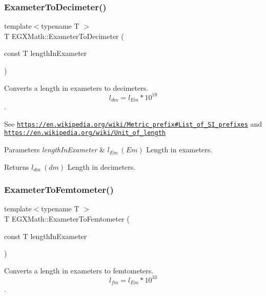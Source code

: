 \subsubsection{\texorpdfstring{Exameter\+To\+Decimeter()}{ExameterToDecimeter()}}
{\footnotesize\ttfamily template$<$typename T $>$ \\
T E\+G\+X\+Math\+::\+Exameter\+To\+Decimeter (\begin{DoxyParamCaption}\item[{const T}]{length\+In\+Exameter }\end{DoxyParamCaption})}



Converts a length in exameters to decimeters. \[ l_{dm}=l_{Em} * 10^{19} \]. 

See \href{https://en.wikipedia.org/wiki/Metric_prefix#List_of_SI_prefixes}{\tt https\+://en.\+wikipedia.\+org/wiki/\+Metric\+\_\+prefix\#\+List\+\_\+of\+\_\+\+S\+I\+\_\+prefixes} and \href{https://en.wikipedia.org/wiki/Unit_of_length}{\tt https\+://en.\+wikipedia.\+org/wiki/\+Unit\+\_\+of\+\_\+length} 
\begin{DoxyParams}{Parameters}
{\em length\+In\+Exameter} & $ l_{Em}\ (Em)$ Length in exameters. \\
\hline
\end{DoxyParams}
\begin{DoxyReturn}{Returns}
$ l_{dm}\ (dm)$ Length in decimeters. 
\end{DoxyReturn}
\mbox{\label{group___e_g_x_math-_conversions-_length_conversions-_s_i-_exameter-_s_i_gaaa4f07b6d6b2e4a9e1947d4d9724c110}} 
\subsubsection{\texorpdfstring{Exameter\+To\+Femtometer()}{ExameterToFemtometer()}}
{\footnotesize\ttfamily template$<$typename T $>$ \\
T E\+G\+X\+Math\+::\+Exameter\+To\+Femtometer (\begin{DoxyParamCaption}\item[{const T}]{length\+In\+Exameter }\end{DoxyParamCaption})}



Converts a length in exameters to femtometers. \[ l_{fm}=l_{Em} * 10^{33} \]. 

